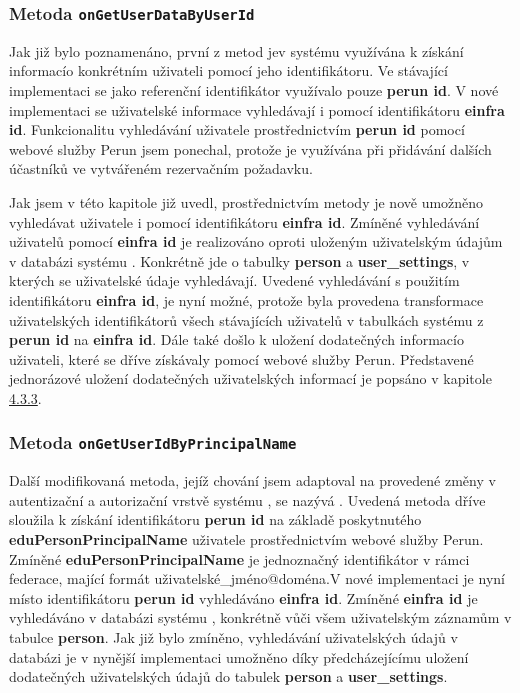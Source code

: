 \documentclass[
  printed, %
  twoside, %
  table,   %
  nolof,     %
  nolot,     %
]{fithesis3}
\begin{document}
\subsubsection{Metoda \texttt{onGetUserDataByUserId}}

Jak již bylo poznamenáno, první z metod  je\break v systému  využívána k získání informací\break o konkrétním uživateli pomocí jeho identifikátoru. Ve stávající implementaci se jako referenční identifikátor využívalo pouze \textbf{perun id}. V nové implementaci se uživatelské informace vyhledávají i pomocí identifikátoru \textbf{einfra id}. Funkcionalitu vyhledávání uživatele prostřednictvím \textbf{perun id} pomocí webové služby Perun jsem ponechal, protože je využívána při přidávání dalších účastníků ve vytvářeném rezervačním požadavku. 

\par 

Jak jsem v této kapitole již uvedl, prostřednictvím metody \linebreak {} je nově umožněno vyhledávat uživatele i pomocí identifikátoru \textbf{einfra id}. Zmíněné vyhledávání uživatelů pomocí \textbf{einfra id} je realizováno oproti uloženým uživatelským údajům v databázi systému . Konkrétně jde o tabulky \textbf{person} a \textbf{user\_settings}, v kterých se uživatelské údaje vyhledávají. Uvedené vyhledávání s použitím identifikátoru \textbf{einfra id}, je nyní možné, protože byla provedena transformace uživatelských identifikátorů všech stávajících uživatelů v tabulkách systému  z \textbf{perun id} na \textbf{einfra id}. Dále také došlo k uložení dodatečných informací\break o uživateli, které se dříve získávaly pomocí webové služby Perun. Představené jednorázové uložení dodatečných uživatelských informací je popsáno v kapitole \hyperref[zpracovaniAUlozeniPerun]{4.3.3}. 

\subsubsection{Metoda \texttt{onGetUserIdByPrincipalName}}

Další modifikovaná metoda, jejíž chování jsem adaptoval na provedené změny v autentizační a autorizační vrstvě systému , se nazývá . Uvedená metoda dříve sloužila k získání identifikátoru \textbf{perun id} na základě poskytnutého \textbf{eduPersonPrincipalName} uživatele prostřednictvím webové služby Perun. Zmíněné \textbf{eduPersonPrincipalName} je jednoznačný identifikátor v rámci federace, mající formát uživatelské\_jméno@doména.\break V nové implementaci je nyní místo identifikátoru \textbf{perun id} vyhledáváno \textbf{einfra id}. Zmíněné \textbf{einfra id} je vyhledáváno v databázi systému , konkrétně vůči všem uživatelským záznamům v tabulce \textbf{person}. Jak již bylo zmíněno, vyhledávání uživatelských údajů v databázi je v nynější implementaci umožněno díky předcházejícímu uložení dodatečných uživatelských údajů do tabulek \textbf{person} a \textbf{user\_settings}.
\end{document}

